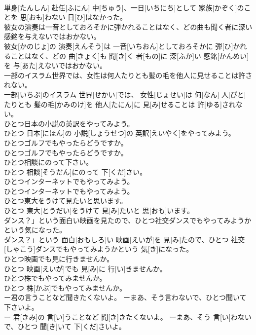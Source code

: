 \documentclass[8pt]{extreport}
\begin{document}
\begin{CJK}{UTF8}{min}
\\	単身[たんしん] 赴任[ふにん] 中[ちゅう]、一日[いちにち]として 家族[かぞく]のことを 思[おも]わない 日[ひ]はなかった。
\\	彼女の演奏は一音としておろそかに弾かれることはなく、どの曲も聞く者に深い感銘を与えないではおかない。	
\\	彼女[かのじょ]の 演奏[えんそう]は 一音[いちおん]としておろそかに 弾[ひ]かれることはなく、どの 曲[きょく]も 聞[き]く 者[もの]に 深[ふか]い 感銘[かんめい]を 与[あた]えないではおかない。
\\	一部のイスラム世界では、女性は何人たりとも髪の毛を他人に見せることは許されない。	
\\	一部[いちぶ]のイスラム 世界[せかい]では、 女性[じょせい]は 何[なん] 人[ぴと]たりとも 髪の毛[かみのけ]を 他人[たにん]に 見[み]せることは 許[ゆる]されない。
\\	ひとつ日本の小説の英訳をやってみよう。	
\\	ひとつ 日本[にほん]の 小説[しょうせつ]の 英訳[えいやく]をやってみよう。
\\	ひとつゴルフでもやったらどうですか。	
\\	ひとつゴルフでもやったらどうですか。
\\	ひとつ相談にのって下さい。	
\\	ひとつ 相談[そうだん]にのって 下[くだ]さい。
\\	ひとつインターネットでもやってみよう。	
\\	ひとつインターネットでもやってみよう。
\\	ひとつ東大をうけて見たいと思います。	
\\	ひとつ 東大[とうだい]をうけて 見[み]たいと 思[おも]います。
\\	ダンス？」という面白い映画を見たので、ひとつ社交ダンスでもやってみようかという気になった。	
\\	ダンス？」という 面白[おもしろ]い 映画[えいが]を 見[み]たので、ひとつ 社交[しゃこう]ダンスでもやってみようかという 気[き]になった。
\\	ひとつ映画でも見に行きませんか。	
\\	ひとつ 映画[えいが]でも 見[み]に 行[い]きませんか。
\\	ひとつ株でもやってみませんか。	
\\	ひとつ 株[かぶ]でもやってみませんか。
\\	ー君の言うことなど聞きたくないよ。 ーまあ、そう言わないで、ひとつ聞いて下さいよ。	
\\	ー 君[きみ]の 言[い]うことなど 聞[き]きたくないよ。 ーまあ、そう 言[い]わないで、ひとつ 聞[き]いて 下[くだ]さいよ。

\end{CJK}
\end{document}
